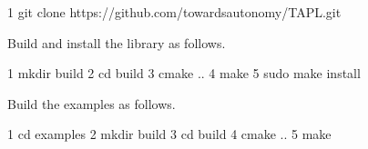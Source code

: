 \begin{DoxyCode}
1 git clone https://github.com/towardsautonomy/TAPL.git
\end{DoxyCode}



\begin{DoxyItemize}
\item Build and install the library as follows.
\end{DoxyItemize}


\begin{DoxyCode}
1 mkdir build  
2 cd build
3 cmake ..
4 make
5 sudo make install
\end{DoxyCode}



\begin{DoxyItemize}
\item Build the examples as follows.
\end{DoxyItemize}


\begin{DoxyCode}
1 cd examples
2 mkdir build
3 cd build
4 cmake ..
5 make
\end{DoxyCode}
 